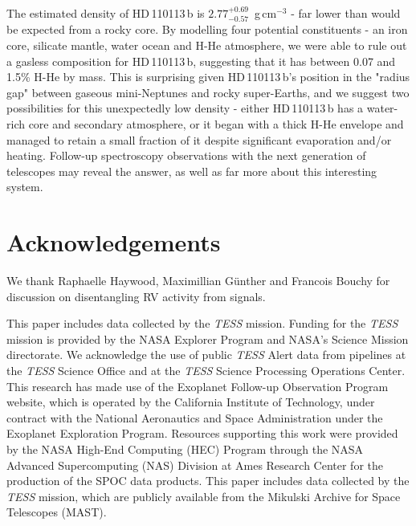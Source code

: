 \documentclass[fleqn,usenatbib]{mnras}
\newcommand{\gcm}{g\,cm$^{-3}$}	%
\newcommand{\tess}{{\it TESS}}
\newcommand{\Trhopgcmthree}{ $ 2.77^{+0.69}_{-0.57} $ }
\newcommand{\Tplanet}{HD\,110113\,b}
\begin{document}
The estimated density of \Tplanet{} is \Trhopgcmthree{}\,\gcm{} - far lower than would be expected from a rocky core.
By modelling four potential constituents - an iron core, silicate mantle, water ocean and H-He atmosphere, we were able to rule out a gasless composition for \Tplanet{}, suggesting that it has between 0.07 and 1.5\% H-He by mass.
This is surprising given \Tplanet{}'s position in the "radius gap" between gaseous mini-Neptunes and rocky super-Earths, and we suggest two possibilities for this unexpectedly low density - either \Tplanet{} has a water-rich core and secondary atmosphere, or it began with a thick H-He envelope and managed to retain a small fraction of it despite significant evaporation and/or heating.
Follow-up spectroscopy observations with the next generation of telescopes may reveal the answer, as well as far more about this interesting system.



\section*{Acknowledgements}
We thank Raphaelle Haywood, Maximillian G{\"u}nther and Francois Bouchy for discussion on disentangling RV activity from signals.

This paper includes data collected by the \tess{} mission.
Funding for the \tess{} mission is provided by the NASA Explorer Program and NASA's Science Mission directorate. 
We acknowledge the use of public \tess{} Alert data from pipelines at the \tess{} Science Office and at the \tess{} Science Processing Operations Center. 
This research has made use of the Exoplanet Follow-up Observation Program website, which is operated by the California Institute of Technology, under contract with the National Aeronautics and Space Administration under the Exoplanet Exploration Program. 
Resources supporting this work were provided by the NASA High-End Computing (HEC) Program through the NASA Advanced Supercomputing (NAS) Division at Ames Research Center for the production of the SPOC data products. 
This paper includes data collected by the \tess{} mission, which are publicly available from the Mikulski Archive for Space Telescopes (MAST).
\end{document}

